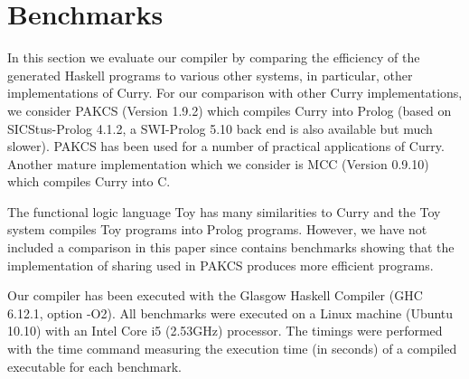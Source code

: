 \documentclass{llncs}
\begin{document}
\section{Benchmarks}
\label{sec:Benchmarks}

In this section we evaluate our compiler by comparing the
efficiency of the generated Haskell programs to various
other systems, in particular, other implementations of Curry.
For our comparison with other Curry implementations,
we consider PAKCS \cite{Hanus10PAKCS} (Version 1.9.2) which compiles
Curry into Prolog \cite{AntoyHanus00FROCOS}
(based on SICStus-Prolog 4.1.2, a SWI-Prolog 5.10 back end is also
available
but much slower). PAKCS has been used for a number of practical
applications of Curry.
Another mature implementation which we consider is MCC \cite{Lux99FLOPS}
(Version 0.9.10) which compiles Curry into C.

The functional logic language Toy \cite{Lopez-FraguasSanchez-Hernandez99}
has many similarities to Curry and the Toy system compiles Toy programs
into Prolog programs. However, we have not included a comparison
in this paper since \cite{AntoyHanus00FROCOS} contains benchmarks
showing that the implementation of sharing used in PAKCS produces
more efficient programs.

Our compiler has been executed with the Glasgow Haskell Compiler
(GHC 6.12.1, option -O2). All benchmarks were executed on a Linux machine
(Ubuntu 10.10) with an Intel Core i5 (2.53GHz) processor.
The timings were performed with the time command measuring the
execution time (in seconds) of a compiled executable for each benchmark.
\end{document}
